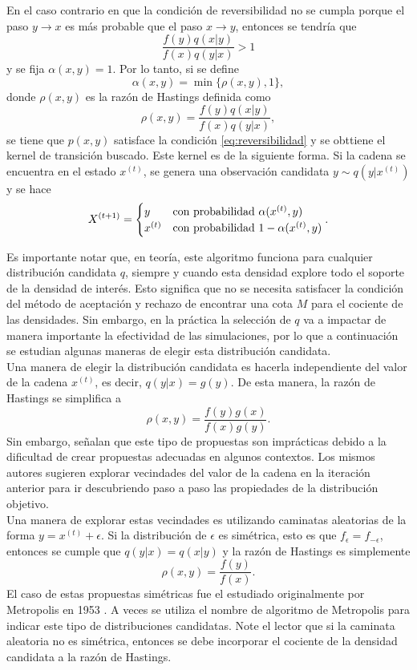 \documentclass[11pt,a4paper]{article}
\begin{document}
En el caso contrario en que la condición de reversibilidad no se cumpla porque el paso $y \to x$ es más probable que el paso $x \to y$, entonces se tendría que $$\frac{f(y)q(x|y)}{f(x)q(y|x)} > 1$$ y se fija $\alpha(x, y) = 1$. Por lo tanto, si se define
\begin{equation}
\label{eq:prob_transicion}
\alpha(x, y) = \min \lbrace \rho(x, y), 1 \rbrace,
\end{equation}
donde $\rho(x, y)$ es la razón de Hastings definida como $$\rho(x, y) = \frac{f(y)q(x|y)}{f(x)q(y|x)},$$ se tiene que $p(x, y)$ satisface la condición \eqref{eq:reversibilidad} y se obttiene el kernel de transición buscado. Este kernel es de la siguiente forma. Si la cadena se encuentra en el estado $x^{(t)}$, se genera una observación candidata $y \sim q(y|x^{(t)})$ y se hace
\begin{equation}
\label{eq:mh}
X^{(t+1)} = \begin{cases} 
      y & \text{con probabilidad } \alpha(x^{(t)}, y)\\
      x^{(t)} & \text{con probabilidad } 1-\alpha(x^{(t)}, y)
   \end{cases}.\\
\end{equation}

Es importante notar que, en teoría, este algoritmo funciona para cualquier distribución candidata $q$, siempre y cuando esta densidad explore todo el soporte de la densidad de interés. Esto significa que no se necesita satisfacer la condición del método de aceptación y rechazo de encontrar una cota $M$ para el cociente de las densidades. Sin embargo, en la práctica la selección de $q$ va a impactar de manera importante la efectividad de las simulaciones, por lo que a continuación se estudian algunas maneras de elegir esta distribución candidata.\\

Una manera de elegir la distribución candidata es hacerla independiente del valor de la cadena $x^{(t)}$, es decir, $q(y|x) = g(y)$. De esta manera, la razón de Hastings se simplifica a $$\rho (x, y) = \frac{f(y)g(x)}{f(x)g(y)}.$$ Sin embargo, \citet{casella} señalan que este tipo de propuestas son imprácticas debido a la dificultad de crear propuestas adecuadas en algunos contextos. Los mismos autores sugieren explorar vecindades del valor de la cadena en la iteración anterior para ir descubriendo paso a paso las propiedades de la distribución objetivo.\\

Una manera de explorar estas vecindades es utilizando caminatas aleatorias de la forma $y = x^{(t)} + \epsilon$. Si la distribución de $\epsilon$ es simétrica, esto es que $f_{\epsilon} = f_{-\epsilon}$, entonces se cumple que $q(y|x) = q(x|y)$ y la razón de Hastings es simplemente $$\rho (x, y) = \frac{f(y)}{f(x)}.$$ El caso de estas propuestas simétricas fue el estudiado originalmente por Metropolis en 1953 \citep{gelman}. A veces se utiliza el nombre de algoritmo de Metropolis para indicar este tipo de distribuciones candidatas. Note el lector que si la caminata aleatoria no es simétrica, entonces se debe incorporar el cociente de la densidad candidata a la razón de Hastings.\\
\end{document}
